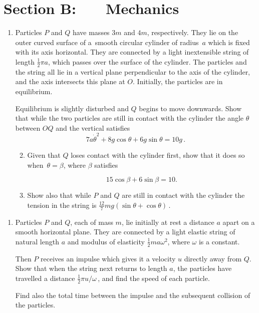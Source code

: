 \documentclass[a4, 11pt]{report}
\newlength{\qspace}
\newcounter{qnumber}
\newenvironment{question}%
 {\vspace{\qspace}
  \begin{enumerate}[\bfseries 1\quad][10]%
    \setcounter{enumi}{\value{qnumber}}%
    \item%
 }
{
  \end{enumerate}
  \filbreak
  \stepcounter{qnumber}
 }
\newenvironment{questionparts}[1][1]%
 {
  \begin{enumerate}[\bfseries (i)]%
    \setcounter{enumii}{#1}
    \addtocounter{enumii}{-1}
    \setlength{\itemsep}{5mm}
    \setlength{\parskip}{8pt}
 }
 {
  \end{enumerate}
 }
\begin{document}
		
	
\newpage
\section*{Section B: \ \ \ Mechanics}


	
\begin{question}
Particles $P$ and $Q$ have masses
$3m$ and $4m$, respectively. They
lie on the outer curved surface of a~smooth 
circular cylinder of radius~$a$
which is fixed with its axis horizontal.
They are connected by a light inextensible 
string of length $\frac12 \pi a$, which passes over the 
surface of the cylinder. The particles and the string all lie
in a vertical plane perpendicular to the axis of the cylinder,
and the axis intersects this plane at $O$.
Initially, the particles are in equilibrium.

Equilibrium is slightly disturbed and $Q$  begins to
move downwards. Show that while the two particles
are still in contact with the cylinder the angle $\theta$
between $OQ$ and
the vertical satisfies
\[
7a\dot\theta^2 +8g \cos\theta + 6 g\sin\theta =   10g\,.
\]

\begin{questionparts}
\item
Given that $Q$ loses contact with 
the cylinder first, show that  it does so when~$\theta=\beta$,
where $\beta$ satisfies 

\[
15\cos\beta +6\sin\beta =10.
\] 

\item
Show also that while $P$ and $Q$ are still in contact 
with the cylinder 
the tension in the string is $\frac {12}7 mg(\sin\theta
+\cos\theta)\,$.
\end{questionparts}
	\end{question}
	
\begin{question}	
Particles $P$ and $Q$, each of mass $m$, lie initially at rest
 a distance $a$ apart on a smooth horizontal plane.
They are connected by a light elastic string of natural
length $a$ and modulus of elasticity
$\frac12 m a \omega^2$, where $\omega$ is a constant.
 
Then $P$ receives an impulse which gives it a 
velocity $u$ directly away from $Q$. Show that when the string 
next returns to length $a$, the particles have travelled
a distance $\frac12 \pi u/\omega\,$, and find the speed of 
each particle. 

Find also the total time between the impulse and the subsequent 
collision of the particles.
\end{question}
\end{document}
